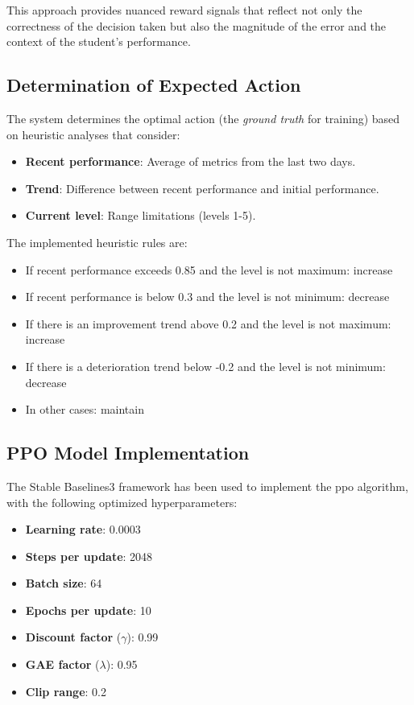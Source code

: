 This approach provides nuanced reward signals that reflect not only the correctness of the decision taken but also the magnitude of the error and the context of the student's performance.


\subsection{Determination of Expected Action}
\label{determinacion-accion-esperada}

The system determines the optimal action (the \textit{ground truth} for training) based on heuristic analyses that consider:

\begin{itemize}
    \item \textbf{Recent performance}: Average of metrics from the last two days.
    \item \textbf{Trend}: Difference between recent performance and initial performance.
    \item \textbf{Current level}: Range limitations (levels 1-5).
\end{itemize}

The implemented heuristic rules are:

\begin{itemize}
    \item If recent performance exceeds 0.85 and the level is not maximum: increase
    \item If recent performance is below 0.3 and the level is not minimum: decrease
    \item If there is an improvement trend above 0.2 and the level is not maximum: increase
    \item If there is a deterioration trend below -0.2 and the level is not minimum: decrease
    \item In other cases: maintain
\end{itemize}

\subsection{PPO Model Implementation}
\label{implementacion-ppo}

The Stable Baselines3 framework has been used to implement the \gls{ppo} algorithm, with the following optimized hyperparameters:

\begin{itemize}
    \item \textbf{Learning rate}: 0.0003
    \item \textbf{Steps per update}: 2048
    \item \textbf{Batch size}: 64
    \item \textbf{Epochs per update}: 10
    \item \textbf{Discount factor} ($\gamma$): 0.99
    \item \textbf{GAE factor} ($\lambda$): 0.95
    \item \textbf{Clip range}: 0.2
\end{itemize}

